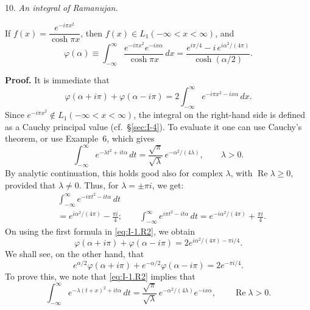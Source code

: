 10. \emph{An integral of Ramanujan.}

If $f(x)=\dfrac{e^{-i\pi x^2}}{\cosh\pi x}$, then $f(x)\in L_1(-\infty<x<\infty)$, and
\begin{equation}\label{eq:I-1.Ramanujan}
\varphi(\alpha)\equiv\int_{-\infty}^{\infty}\frac{e^{-i\pi x^2}e^{-ix\alpha}}{\cosh\pi x}\,dx
=\frac{e^{i\pi/4}-i\,e^{i\alpha^2/(4\pi)}}{\cosh(\alpha/2)}.
\end{equation}

\noindent\textbf{Proof.}
It is immediate that
\begin{equation}\label{eq:I-1.R1}
\varphi(\alpha+i\pi)+\varphi(\alpha-i\pi)
=2\int_{-\infty}^{\infty}e^{-i\pi x^2-ix\alpha}\,dx.
\end{equation}
Since $e^{-i\pi x^2}\notin L_1(-\infty<x<\infty)$, the integral on the right-hand side is defined as a Cauchy principal value (cf.\ \S\ref{sec:I-4}). To evaluate it one can use Cauchy's theorem, or use Example~6, which gives
\begin{equation}\label{eq:I-1.R2}
\int_{-\infty}^{\infty}e^{-\lambda t^2+it\alpha}\,dt
=\frac{\sqrt\pi}{\sqrt\lambda}\,e^{-\alpha^2/(4\lambda)},
\qquad\lambda>0.
\end{equation}
By analytic continuation, this holds good also for complex $\lambda$, with $\operatorname{Re}\lambda\ge 0$, provided that $\lambda\neq 0$. Thus, for $\lambda=\pm\pi i$, we get:
\begin{equation}\label{eq:I-1.R3}
\begin{aligned}
&\int_{-\infty}^{\infty}e^{-i\pi t^2-it\alpha}\,dt\\
&= e^{i\alpha^2/(4\pi)} - \frac{\pi i}{4};  \qquad  \int_{-\infty}^{\infty}e^{i\pi t^2-it\alpha}\,dt = e^{-i\alpha^2/(4\pi)} + \frac{\pi i}{4}.
\end{aligned}
\end{equation}
On using the first formula in \eqref{eq:I-1.R2}, we obtain
\begin{equation}\label{eq:I-1.R4}
\varphi(\alpha+i\pi)+\varphi(\alpha-i\pi)
=2e^{i\alpha^2/(4\pi)-\pi i/4}.
\end{equation}
We shall see, on the other hand, that
\begin{equation}\label{eq:I-1.R5}
e^{\alpha/2}\varphi(\alpha+i\pi)+e^{-\alpha/2}\varphi(\alpha-i\pi)=2e^{-\pi i/4}.
\end{equation}
To prove this, we note that \eqref{eq:I-1.R2} implies that
\begin{equation}\label{eq:I-1.R6}
\int_{-\infty}^{\infty}e^{-\lambda(t+x)^2+it\alpha}\,dt
=\frac{\sqrt\pi}{\sqrt\lambda}\,e^{-\alpha^2/(4\lambda)}e^{-ix\alpha},
\qquad\operatorname{Re}\lambda>0.
\end{equation}
